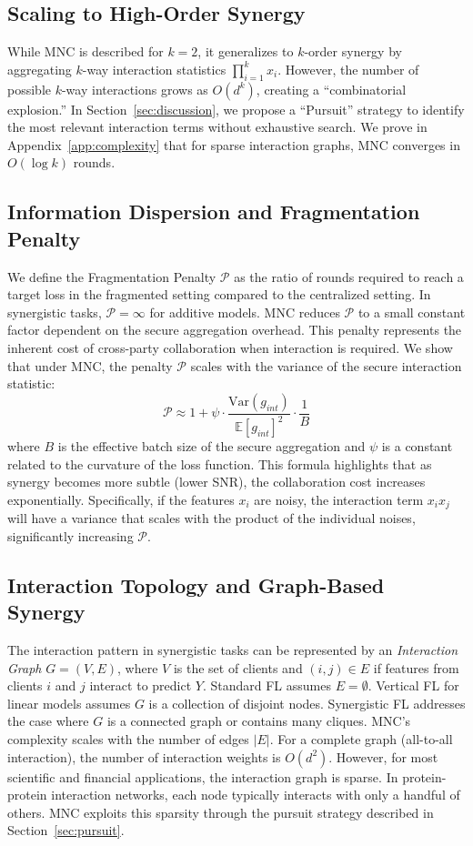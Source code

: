 \documentclass{article}
\theoremstyle{plain}
\theoremstyle{definition}
\newcommand{\E}{\mathbb{E}}
\begin{document}
\subsection{Scaling to High-Order Synergy}
While MNC is described for $k=2$, it generalizes to $k$-order synergy by aggregating $k$-way interaction statistics $\prod_{i=1}^k x_i$. However, the number of possible $k$-way interactions grows as $O(d^k)$, creating a ``combinatorial explosion.'' In Section~\ref{sec:discussion}, we propose a ``Pursuit'' strategy to identify the most relevant interaction terms without exhaustive search. We prove in Appendix~\ref{app:complexity} that for sparse interaction graphs, MNC converges in $O(\log k)$ rounds.

\subsection{Information Dispersion and Fragmentation Penalty}
We define the Fragmentation Penalty $\mathcal{P}$ as the ratio of rounds required to reach a target loss in the fragmented setting compared to the centralized setting. In synergistic tasks, $\mathcal{P} = \infty$ for additive models. MNC reduces $\mathcal{P}$ to a small constant factor dependent on the secure aggregation overhead. This penalty represents the inherent cost of cross-party collaboration when interaction is required. We show that under MNC, the penalty $\mathcal{P}$ scales with the variance of the secure interaction statistic:
\begin{equation}
    \mathcal{P} \approx 1 + \psi \cdot \frac{\text{Var}(g_{int})}{\E[g_{int}]^2} \cdot \frac{1}{B}
\end{equation}
where $B$ is the effective batch size of the secure aggregation and $\psi$ is a constant related to the curvature of the loss function. This formula highlights that as synergy becomes more subtle (lower SNR), the collaboration cost increases exponentially. Specifically, if the features $x_i$ are noisy, the interaction term $x_i x_j$ will have a variance that scales with the product of the individual noises, significantly increasing $\mathcal{P}$.

\subsection{Interaction Topology and Graph-Based Synergy}
The interaction pattern in synergistic tasks can be represented by an \emph{Interaction Graph} $G = (V, E)$, where $V$ is the set of clients and $(i, j) \in E$ if features from clients $i$ and $j$ interact to predict $Y$. Standard FL assumes $E = \emptyset$. Vertical FL for linear models assumes $G$ is a collection of disjoint nodes. Synergistic FL addresses the case where $G$ is a connected graph or contains many cliques.
MNC's complexity scales with the number of edges $|E|$. For a complete graph (all-to-all interaction), the number of interaction weights is $O(d^2)$. However, for most scientific and financial applications, the interaction graph is sparse. In protein-protein interaction networks, each node typically interacts with only a handful of others. MNC exploits this sparsity through the pursuit strategy described in Section~\ref{sec:pursuit}.
\end{document}
